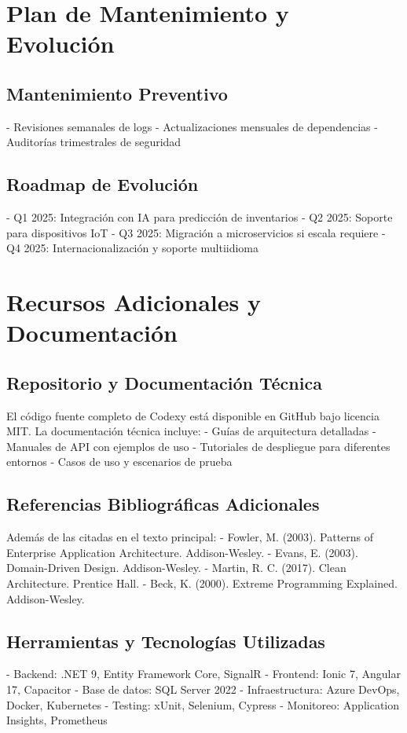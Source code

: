 \section{Plan de Mantenimiento y Evolución}

\subsection{Mantenimiento Preventivo}
- Revisiones semanales de logs
- Actualizaciones mensuales de dependencias
- Auditorías trimestrales de seguridad

\subsection{Roadmap de Evolución}
- Q1 2025: Integración con IA para predicción de inventarios
- Q2 2025: Soporte para dispositivos IoT
- Q3 2025: Migración a microservicios si escala requiere
- Q4 2025: Internacionalización y soporte multiidioma

\section{Recursos Adicionales y Documentación}

\subsection{Repositorio y Documentación Técnica}
El código fuente completo de Codexy está disponible en GitHub bajo licencia MIT. La documentación técnica incluye:
- Guías de arquitectura detalladas
- Manuales de API con ejemplos de uso
- Tutoriales de despliegue para diferentes entornos
- Casos de uso y escenarios de prueba

\subsection{Referencias Bibliográficas Adicionales}
Además de las citadas en el texto principal:
- Fowler, M. (2003). Patterns of Enterprise Application Architecture. Addison-Wesley.
- Evans, E. (2003). Domain-Driven Design. Addison-Wesley.
- Martin, R. C. (2017). Clean Architecture. Prentice Hall.
- Beck, K. (2000). Extreme Programming Explained. Addison-Wesley.

\subsection{Herramientas y Tecnologías Utilizadas}
- Backend: .NET 9, Entity Framework Core, SignalR
- Frontend: Ionic 7, Angular 17, Capacitor
- Base de datos: SQL Server 2022
- Infraestructura: Azure DevOps, Docker, Kubernetes
- Testing: xUnit, Selenium, Cypress
- Monitoreo: Application Insights, Prometheus

